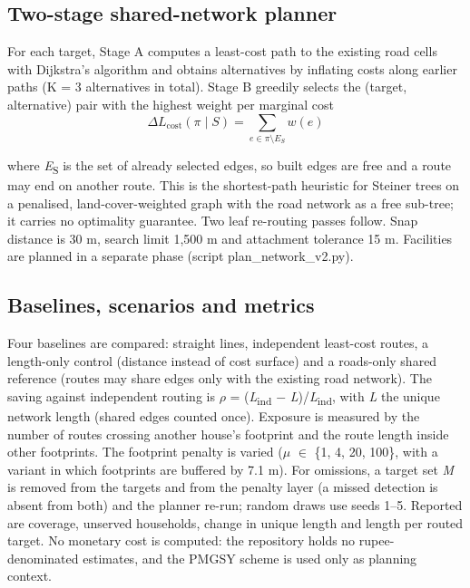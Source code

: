 \documentclass[journal]{IEEEtran}
\begin{document}
\subsection{Two-stage shared-network planner}

For each target, Stage A computes a least-cost path to the existing road cells with Dijkstra's algorithm \cite{dijkstra1959note,hart1968astar,collischonn2000lcp} and obtains alternatives by inflating costs along earlier paths (K = 3 alternatives in total). Stage B greedily selects the (target, alternative) pair with the highest weight per marginal cost
\begin{equation}
\Delta L_{\mathrm{cost}}(\pi \mid S) = \sum_{e \in \pi \setminus E_S} w(e)
\label{eq:2}
\end{equation}

where \textit{E}\textsubscript{S} is the set of already selected edges, so built edges are free and a route may end on another route. This is the shortest-path heuristic for Steiner trees \cite{kou1981steiner,mehlhorn1988steiner} on a penalised, land-cover-weighted graph with the road network as a free sub-tree; it carries no optimality guarantee. Two leaf re-routing passes follow. Snap distance is 30 m, search limit 1,500 m and attachment tolerance 15 m. Facilities are planned in a separate phase (script plan\_network\_v2.py).

\subsection{Baselines, scenarios and metrics}

Four baselines are compared: straight lines, independent least-cost routes, a length-only control (distance instead of cost surface) and a roads-only shared reference (routes may share edges only with the existing road network). The saving against independent routing is $\rho$ = (\textit{L}\textsubscript{ind} $-$ \textit{L})/\textit{L}\textsubscript{ind}, with \textit{L} the unique network length (shared edges counted once). Exposure is measured by the number of routes crossing another house's footprint and the route length inside other footprints. The footprint penalty is varied ($\mu$ $\in$ \{1, 4, 20, 100\}, with a variant in which footprints are buffered by 7.1 m). For omissions, a target set \textit{M} is removed from the targets and from the penalty layer (a missed detection is absent from both) and the planner re-run; random draws use seeds 1--5. Reported are coverage, unserved households, change in unique length and length per routed target. No monetary cost is computed: the repository holds no rupee-denominated estimates, and the PMGSY scheme \cite{pmgsy} is used only as planning context.
\end{document}
